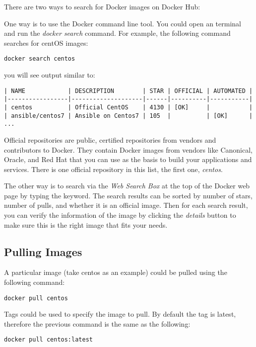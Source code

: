 There are two ways to search for Docker images on Docker Hub:

One way is to use the Docker command line tool. You could open an
terminal and run the \emph{docker search} command. For example, the
following command searches for centOS images:

\begin{lstlisting}
docker search centos
\end{lstlisting}

you will see output similar to:

\begin{lstlisting}
| NAME            | DESCRIPTION        | STAR | OFFICIAL | AUTOMATED |
|-----------------|--------------------|------|----------|-----------|
| centos          | Official CentOS    | 4130 | [OK]     |           |
| ansible/centos7 | Ansible on Centos7 | 105  |          | [OK]      |
...
\end{lstlisting}

Official repositories are public, certified repositories from vendors
and contributors to Docker. They contain Docker images from vendors
like Canonical, Oracle, and Red Hat that you can use as the basis to
build your applications and services. There is one official repository
in this list, the first one, \emph{centos}.

The other way is to search via the \emph{Web Search Box} at the top of the
Docker web page by typing the keyword. The search results can be sorted
by number of stars, number of pulls, and whether it is an official
image. Then for each search result, you can verify the information of
the image by clicking the \emph{details} button to make sure this is the
right image that fits your needs.

\subsection{Pulling Images}

A particular image (take centos as an example) could be pulled using the
following command:

\begin{lstlisting}
docker pull centos
\end{lstlisting}

Tags could be used to specify the image to pull. By default the tag is
latest, therefore the previous command is the same as the following:

\begin{lstlisting}
docker pull centos:latest
\end{lstlisting}

